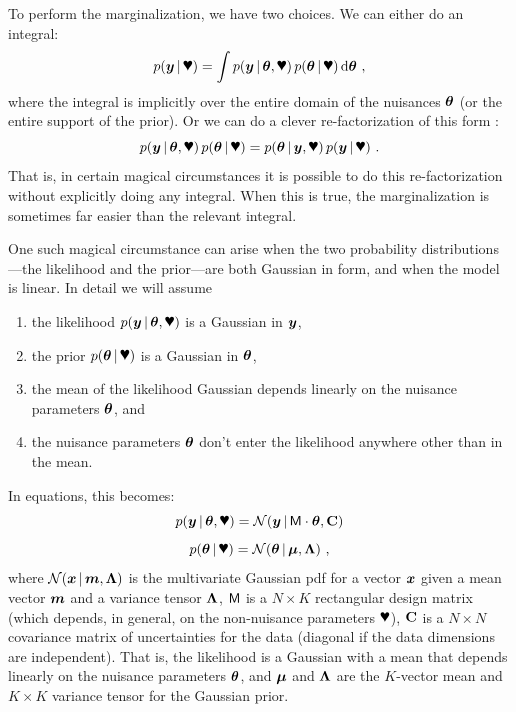 To perform the marginalization, we have two choices.
We can either do an integral:
\begin{equation}
p(\vy\given\bP) = \int p(\vy\given\vtheta,\bP)\,p(\vtheta\given\bP)\,\dd\vtheta
~ ,
\end{equation}
where the integral is implicitly over the entire domain of the
nuisances $\boldsymbol{\theta}$ (or the entire support of the prior).
Or we can do a clever re-factorization of this form :
\begin{equation}
p(\vy\given\vtheta,\bP)\,p(\vtheta\given\bP)
 = p(\vtheta\given\vy,\bP)\,p(\vy\given\bP)
~ .
\end{equation}
That is, in certain magical circumstances it is possible to do this
re-factorization without explicitly doing any integral.
When this is true, the marginalization is sometimes far easier than
the relevant integral.

One such magical circumstance can arise when the two probability
distributions---the likelihood and the prior---are both Gaussian in
form, and when the model is linear.
In detail we will assume
\begin{enumerate}
\item
the likelihood $p(\vy\given\vtheta,\bP)$ is a Gaussian in $\boldsymbol{y}$,
\item
the prior $p(\vtheta\given\bP)$ is a Gaussian in $\boldsymbol{\theta}$,
\item
the mean of the likelihood Gaussian depends linearly on the nuisance
parameters $\boldsymbol{\theta}$, and
\item
the nuisance parameters $\boldsymbol{\theta}$ don't enter the likelihood anywhere
other than in the mean.
\end{enumerate}
In equations, this becomes:
\begin{equation}
p(\vy\given\vtheta,\bP) = \normal(\vy\given\mM\cdot\vtheta,\tC)
\end{equation}
\begin{equation}
p(\vtheta\given\bP) = \normal(\vtheta\given\vmu,\tLambda)
~ ,
\end{equation}
where
$\mathcal{N}\!\,(\boldsymbol{x}\,|\,\boldsymbol{m},\mathbf{\Lambda})$ is the multivariate Gaussian pdf for a vector $\boldsymbol{x}$
given a mean vector $\boldsymbol{m}$ and a variance tensor $\mathbf{\Lambda}$,
$\mathsf{M}$ is a $N\times K$ rectangular design matrix (which depends, in
general, on the non-nuisance parameters $\bP$),
$\mathbf{C}$ is a $N\times N$ covariance matrix of uncertainties for the
data (diagonal if the data dimensions are independent).
That is, the likelihood is a Gaussian with a mean that depends
linearly on the nuisance parameters $\boldsymbol{\theta}$, and
$\boldsymbol{\mu}$ and $\mathbf{\Lambda}$ are the $K$-vector mean and $K\times K$ variance tensor
for the Gaussian prior.

